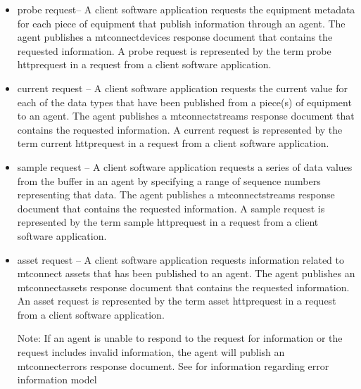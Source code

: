 \begin{itemize}
\item \gls{probe request}-- A client software application requests the \gls{equipment metadata} for each piece of equipment that \MAY publish information through an \gls{agent}.  The \gls{agent} publishes a \gls{mtconnectdevices response document} that contains the requested information.  A \gls{probe request} is represented by the term \gls{probe httprequest} in a \gls{request} from a client software application.

\item \gls{current request} -- A client software application requests the current value for each of the data types that have been published from a piece(s) of equipment to an \gls{agent}.  The \gls{agent} publishes a \gls{mtconnectstreams response document} that contains the requested information.  A \gls{current request} is represented by the term \gls{current httprequest} in a \gls{request} from a client software application.

\item \gls{sample request} -- A client software application requests a series of data values from the \gls{buffer} in an \gls{agent} by specifying a range of \glspl{sequence number} representing that data.  The \gls{agent} publishes a \gls{mtconnectstreams response document} that contains the requested information.  A \gls{sample request} is represented by the term \gls{sample httprequest} in a \gls{request} from a client software application.

\item \gls{asset request} -- A client software application requests information related to \glspl{mtconnect asset} that has been published to an \gls{agent}.  The \gls{agent} publishes an \gls{mtconnectassets response document} that contains the requested information.  An \gls{asset request} is represented by the term \gls{asset httprequest} in a \gls{request} from a client software application.

\begin{note}
Note: If an \gls{agent} is unable to respond to the request for information or the request includes invalid information, the \gls{agent} will publish an \gls{mtconnecterrors response document}. See  for information regarding \gls{error information model}

\end{note}

\end{itemize}

